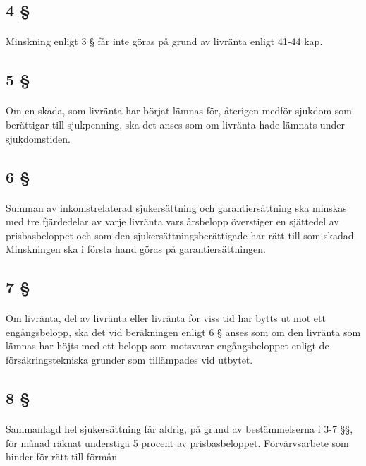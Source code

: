 \documentclass[a4paper,notitlepage,openany,10pt]{book}
\begin{document}
\subsection*{4 §}
\paragraph*{}
Minskning enligt 3 § får inte göras på grund av livränta enligt 41-44 kap.
\subsection*{5 §}
\paragraph*{}
Om en skada, som livränta har börjat lämnas för, återigen medför sjukdom som berättigar till sjukpenning, ska det anses som om livränta hade lämnats under sjukdomstiden.
\subsection*{6 §}
\paragraph*{}
Summan av inkomstrelaterad sjukersättning och garantiersättning ska minskas med tre fjärdedelar av varje livränta vars årsbelopp överstiger en sjättedel av prisbasbeloppet och som den sjukersättningsberättigade har rätt till som skadad. Minskningen ska i första hand göras på garantiersättningen.
\subsection*{7 §}
\paragraph*{}
Om livränta, del av livränta eller livränta för viss tid har bytts ut mot ett engångsbelopp, ska det vid beräkningen enligt 6 § anses som om den livränta som lämnas har höjts med ett belopp som motsvarar engångsbeloppet enligt de försäkringstekniska grunder som tillämpades vid utbytet.
\subsection*{8 §}
\paragraph*{}
Sammanlagd hel sjukersättning får aldrig, på grund av bestämmelserna i 3-7 §§, för månad räknat understiga 5 procent av prisbasbeloppet.
Förvärvsarbete som hinder för rätt till förmån
\end{document}
